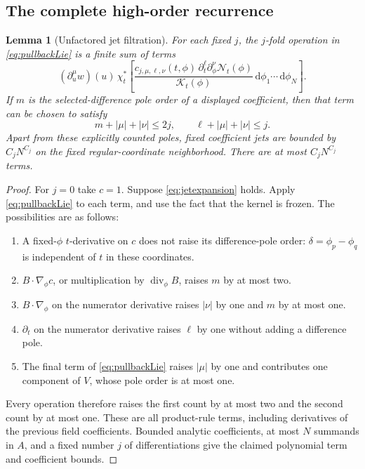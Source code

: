\documentclass[11pt]{article}
\numberwithin{equation}{section}
\newtheorem{lemma}[theorem]{Lemma}
\theoremstyle{definition}
\newcommand{\dd}{\,\mathrm d}
\begin{document}
\subsection{The complete high-order recurrence}
\begin{lemma}[Unfactored jet filtration]\label{lem:jets}
For each fixed \(j\), the \(j\)-fold operation in
\eqref{eq:pullbackLie} is a finite sum of terms
\begin{equation}
 (\partial_u^\mu w)(u)\,
 \chi_t^*\left[
  \frac{c_{j,\mu,\ell,\nu}(t,\phi)\,
        \partial_t^\ell\partial_\phi^\nu\mathscr N_t(\phi)}
       {\mathcal K_t(\phi)}
       \dd\phi_1\cdots\dd\phi_N\right].
 \label{eq:jetexpansion}
\end{equation}
If \(m\) is the selected-difference pole order of a displayed
coefficient, then that term can be chosen to satisfy
\begin{equation}
 m+|\mu|+|\nu|\le2j,\qquad
 \ell+|\mu|+|\nu|\le j .
 \label{eq:jetdegree}
\end{equation}
Apart from these explicitly counted poles, fixed coefficient jets
are bounded by \(C_jN^{C_j}\) on the fixed regular-coordinate
neighborhood. There are at most \(C_jN^{C_j}\) terms.
\end{lemma}
\begin{proof}
For \(j=0\) take \(c=1\). Suppose \eqref{eq:jetexpansion} holds.
Apply \eqref{eq:pullbackLie} to each term, and use the fact that
the kernel is frozen. The possibilities are as follows:
\begin{enumerate}
\item A fixed-\(\phi\) \(t\)-derivative on \(c\) does not raise its
difference-pole order: \(\delta=\phi_p-\phi_q\) is independent of
\(t\) in these coordinates.
\item \(B\cdot\nabla_\phi c\), or multiplication by
\(\operatorname{div}_\phi B\), raises \(m\) by at most two.
\item \(B\cdot\nabla_\phi\) on the numerator derivative raises
\(|\nu|\) by one and \(m\) by at most one.
\item \(\partial_t\) on the numerator derivative raises \(\ell\)
by one without adding a difference pole.
\item The final term of \eqref{eq:pullbackLie} raises \(|\mu|\)
by one and contributes one component of \(V\), whose pole
order is at most one.
\end{enumerate}
Every operation therefore raises the first count by at most two
and the second count by at most one. These are all product-rule
terms, including derivatives of the previous field coefficients.
Bounded analytic coefficients, at most \(N\) summands in \(A\),
and a fixed number \(j\) of differentiations give the claimed
polynomial term and coefficient bounds.
\end{proof}
\end{document}
